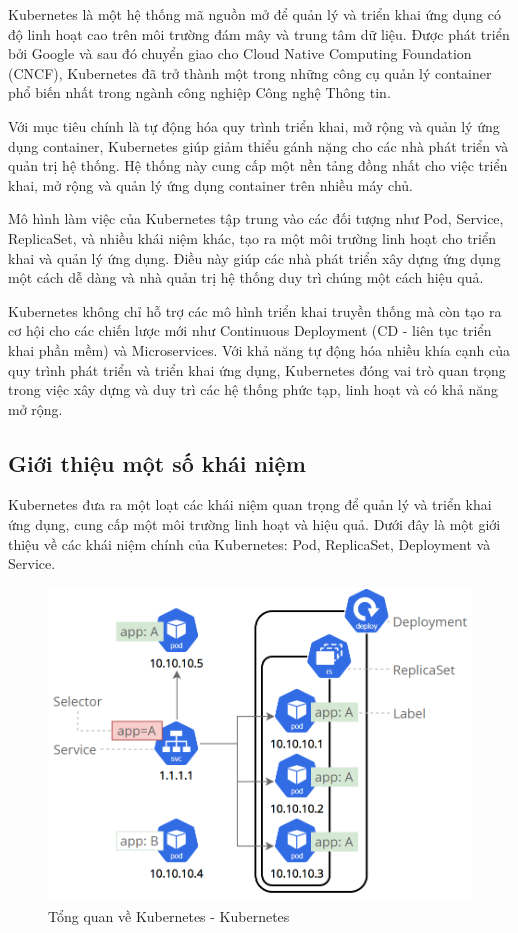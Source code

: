 Kubernetes là một hệ thống mã nguồn mở để quản lý và triển khai ứng dụng có độ linh hoạt cao trên môi trường đám mây và trung tâm dữ liệu. Được phát triển bởi Google và sau đó chuyển giao cho Cloud Native Computing Foundation (CNCF), Kubernetes đã trở thành một trong những công cụ quản lý container phổ biến nhất trong ngành công nghiệp Công nghệ Thông tin.\cite{k8s-doc}

Với mục tiêu chính là tự động hóa quy trình triển khai, mở rộng và quản lý ứng dụng container, Kubernetes giúp giảm thiểu gánh nặng cho các nhà phát triển và quản trị hệ thống. Hệ thống này cung cấp một nền tảng đồng nhất cho việc triển khai, mở rộng và quản lý ứng dụng container trên nhiều máy chủ.

Mô hình làm việc của Kubernetes tập trung vào các đối tượng như Pod, Service, ReplicaSet, và nhiều khái niệm khác, tạo ra một môi trường linh hoạt cho triển khai và quản lý ứng dụng. Điều này giúp các nhà phát triển xây dựng ứng dụng một cách dễ dàng và nhà quản trị hệ thống duy trì chúng một cách hiệu quả.

Kubernetes không chỉ hỗ trợ các mô hình triển khai truyền thống mà còn tạo ra cơ hội cho các chiến lược mới như Continuous Deployment (CD - liên tục triển khai phần mềm) và Microservices. Với khả năng tự động hóa nhiều khía cạnh của quy trình phát triển và triển khai ứng dụng, Kubernetes đóng vai trò quan trọng trong việc xây dựng và duy trì các hệ thống phức tạp, linh hoạt và có khả năng mở rộng.

\subsection{Giới thiệu một số khái niệm}

Kubernetes đưa ra một loạt các khái niệm quan trọng để quản lý và triển khai ứng dụng, cung cấp một môi trường linh hoạt và hiệu quả. Dưới đây là một giới thiệu về các khái niệm chính của Kubernetes: Pod, ReplicaSet, Deployment và Service.

\begin{figure}[H]
    \centering
    \includegraphics[width=0.75\linewidth]{Images/3.4-k8s-comps.png}
    \caption{Tổng quan về Kubernetes - Kubernetes}
    \label{fig:k8s-comps}
\end{figure}

